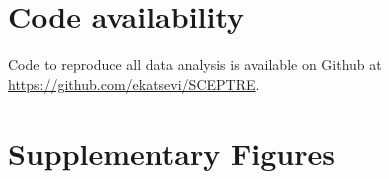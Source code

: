 \documentclass{nature}
\begin{document}
\section*{Code availability}

Code to reproduce all data analysis is available on Github at \url{https://github.com/ekatsevi/SCEPTRE}.

\clearpage 

\appendix

\section{Supplementary Figures}
\renewcommand{\thesection}{S}

\vspace{0.25in}




\thispagestyle{empty}

\end{document}
